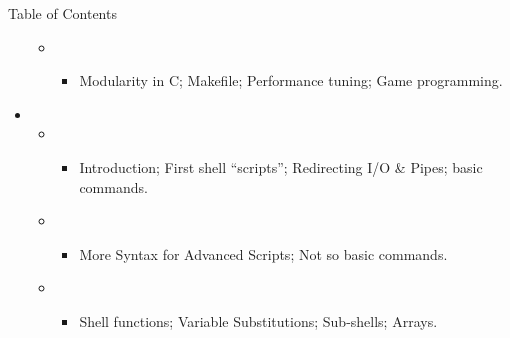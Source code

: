 \begin{frame}[squeeze]{Table of Contents}
\begin{itemize}
\begin{itemize}
    \item {}
      \begin{itemize}
      \item Modularity in C; Makefile; Performance tuning; Game programming.
      \end{itemize}
    \end{itemize}
    \medskip
  \item[\numberedball{2}] 
    \begin{itemize}
    \item {}
      \begin{itemize}
      \item Introduction; First shell ``scripts''; Redirecting I/O \& Pipes;
        basic commands.
      \end{itemize}
    \item {}
      \begin{itemize}
      \item More Syntax for Advanced Scripts; Not so basic commands.
      \end{itemize}
    \item {}
      \begin{itemize}
      \item Shell functions; Variable Substitutions; Sub-shells; Arrays.  
      \end{itemize}

    \end{itemize}
  \end{itemize}    
\end{frame}